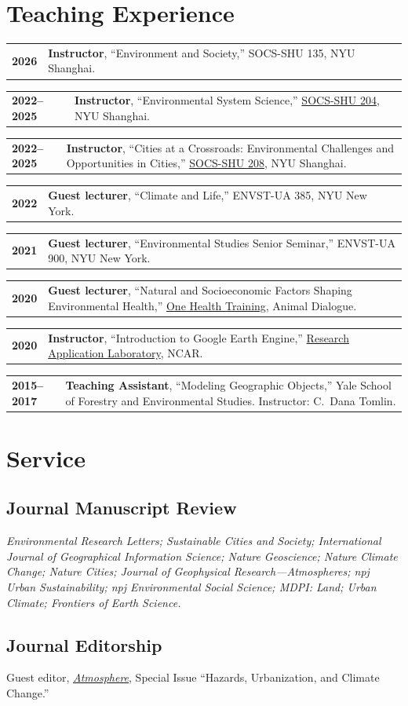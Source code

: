\documentclass[11pt,letterpaper]{article}
\makeatletter
\newcommand{\cventry}[2]{%
  \noindent\begin{tabularx}{\textwidth}{@{}l X@{}}
    \textbf{#1} & #2
  \end{tabularx}\vspace{2pt}%
}
\makeatother
\begin{document}
\section{Teaching Experience}
\cventry{2026}{\textbf{Instructor}, ``Environment and Society,'' SOCS-SHU 135, NYU Shanghai.}
\cventry{2022--2025}{\textbf{Instructor}, ``Environmental System Science,'' \href{https://docs.google.com/document/d/e/2PACX-1vSnLH1DcYAtjhmYVq1k46Zb8-aDYIfBsZWCInBYVJuLiYnjSO0hxBMZq8wBz-8n4p8Utt2J9_5mUK03/pub}{SOCS-SHU 204}, NYU Shanghai.}
\cventry{2022--2025}{\textbf{Instructor}, ``Cities at a Crossroads: Environmental Challenges and Opportunities in Cities,'' \href{https://docs.google.com/document/d/e/2PACX-1vTrhXo9OGMOFASQhge4gDUPwET_PLufDlfaA2kwZhVEZIc9VCMPkc0FkQl9ORC8Z2VgpaxWGg1gcrUW/pub}{SOCS-SHU 208}, NYU Shanghai.}
\cventry{2022}{\textbf{Guest lecturer}, ``Climate and Life,'' ENVST-UA 385, NYU New York.}
\cventry{2021}{\textbf{Guest lecturer}, ``Environmental Studies Senior Seminar,'' ENVST-UA 900, NYU New York.}
\cventry{2020}{\textbf{Guest lecturer}, ``Natural and Socioeconomic Factors Shaping Environmental Health,'' \href{https://animaldialogue.org/education/nature-courses/one-health-training/}{One Health Training}, Animal Dialogue.}
\cventry{2020}{\textbf{Instructor}, ``Introduction to Google Earth Engine,'' \href{https://ral.ucar.edu/events/2020/ral-seminar-1}{Research Application Laboratory}, NCAR.}
\cventry{2015--2017}{\textbf{Teaching Assistant}, ``Modeling Geographic Objects,'' Yale School of Forestry and Environmental Studies. Instructor: C.~Dana Tomlin.}

\section{Service}

\subsection{Journal Manuscript Review}
\textit{Environmental Research Letters; Sustainable Cities and Society; International Journal of Geographical Information Science; Nature Geoscience; Nature Climate Change; Nature Cities; Journal of Geophysical Research---Atmospheres; npj Urban Sustainability; npj Environmental Social Science; MDPI: Land; Urban Climate; Frontiers of Earth Science.}

\subsection{Journal Editorship}
Guest editor, \href{https://www.mdpi.com/journal/atmosphere/special_issues/hazards_urbanization_climate}{\textit{Atmosphere}}, Special Issue ``Hazards, Urbanization, and Climate Change.''
\end{document}
